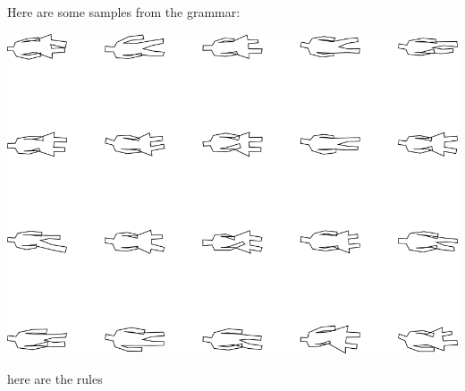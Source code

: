 Here are some samples from the grammar:

\includegraphics[width=6in]{output/1.models/hand_built/romerchoice/samples.png}

here are the rules

